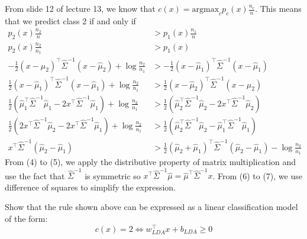 \documentclass{article}
\begin{document}
\begin{probset}
\begin{prob}
\begin{subprobset}
\begin{subprob}
            \begin{soln}
                From slide 12 of lecture 13, we know that $c(x) = \text{argmax}_c p_c(x)\frac{n_c}{n}$. This means that we predict class 2 if and only if
                \begin{align}
                    p_2(x) \frac{n_2}{n} &> p_1(x) \frac{n_1}{n} \\
                    p_2(x) \frac{n_2}{n_1} &> p_1(x) \\
                    - \frac{1}{2} (x - \hat{\mu}_2)^\top \hat\Sigma^{-1} (x - \hat{\mu}_2) + \log \frac{n_2}{n_1} &> - \frac{1}{2} (x - \hat{\mu}_1)^\top \hat\Sigma^{-1} (x - \hat{\mu}_1) \\
                    \frac{1}{2} (x - \hat{\mu}_1)^\top \hat\Sigma^{-1} (x - \hat{\mu}_1) + \log \frac{n_2}{n_1} &> \frac{1}{2} (x - \hat{\mu}_2)^\top \hat\Sigma^{-1} (x - \hat{\mu}_2) \\
                    \frac{1}{2} ( \hat{\mu}_1^\top \hat\Sigma^{-1} \hat{\mu}_1 - 2x^\top\hat\Sigma^{-1} \hat{\mu}_1 ) + \log \frac{n_2}{n_1} &> \frac{1}{2} (\hat{\mu}_2^\top \hat\Sigma^{-1} \hat{\mu}_2 - 2x^\top\hat\Sigma^{-1} \hat{\mu}_2) \\
                    \frac{1}{2} ( 2x^\top\hat\Sigma^{-1} \hat{\mu}_2 - 2x^\top\hat\Sigma^{-1} \hat{\mu}_1 ) + \log \frac{n_2}{n_1} &> \frac{1}{2} (\hat{\mu}_2^\top \hat\Sigma^{-1} \hat{\mu}_2 - \hat{\mu}_1^\top \hat\Sigma^{-1} \hat{\mu}_1 ) \\
                    x^\top \hat{\Sigma}^{-1} (\hat{\mu}_2 - \hat{\mu}_1) &> \frac{1}{2} (\hat{\mu}_2 + \hat{\mu}_1)^\top \hat{\Sigma}^{-1} (\hat{\mu}_2 - \hat{\mu}_1) - \log \frac{n_2}{n_1}
                \end{align}
                From (4) to (5), we apply the distributive property of matrix multiplication and use the fact that $\hat{\Sigma}^{-1}$ is symmetric so $x^\top \hat{\Sigma}^{-1} \hat\mu = \hat\mu^\top \hat{\Sigma}^{-1} x$. From (6) to (7), we use difference of squares to simplify the expression.
            \end{soln}
        \end{subprob}

        \begin{subprob}
            Show that the rule shown above can be expressed as a linear classification model of the form:
            \[ c(x) = 2 \Leftrightarrow w^\top_{LDA} x + b_{LDA} \geq 0 \]


\end{subprob}
\end{subprobset}
\end{prob}
\end{probset}
\end{document}
